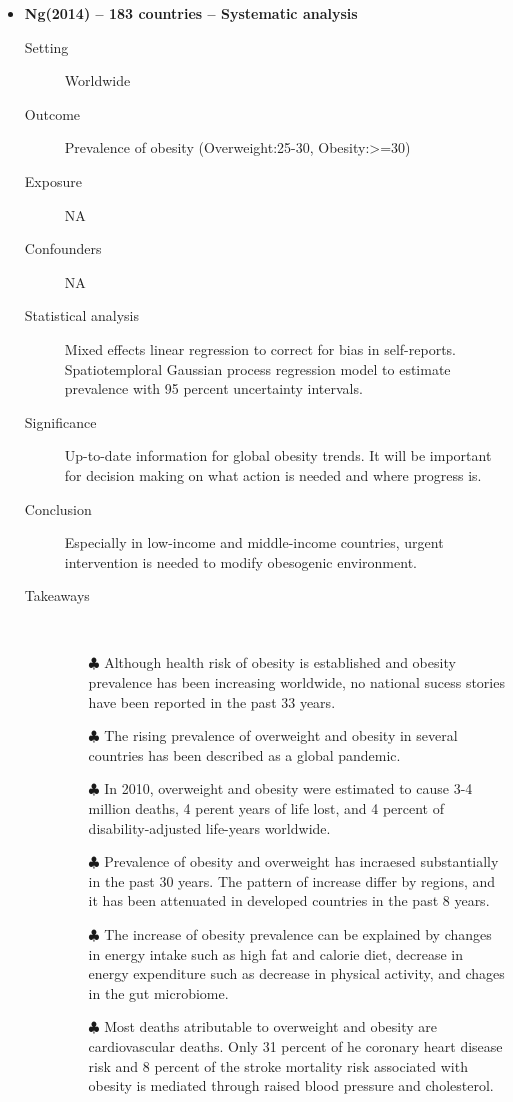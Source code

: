 \documentclass{article}
\begin{document}
\begin{itemize}
\item{\bf Ng(2014) -- 183 countries -- Systematic analysis} 
		\begin{description}
			\item[Setting] Worldwide 
			\item[Outcome] Prevalence of obesity (Overweight:25-30, Obesity:>=30) 
			\item[Exposure] NA 
			\item[Confounders] NA 
			\item[Statistical analysis] Mixed effects linear regression to correct for bias in self-reports. Spatiotemploral Gaussian process regression model to estimate prevalence with 95 percent uncertainty intervals. 
			\item[Significance] Up-to-date information for global obesity trends. It will be important for decision making on what action is needed and where progress is. 
			\item[Conclusion] Especially in low-income and middle-income countries, urgent intervention is needed to modify obesogenic environment. 
			\item[Takeaways] \mbox{}\\
				\begin{itemize}
					\item[$\clubsuit$] Although health risk of obesity is established and obesity prevalence has been increasing worldwide, no national sucess stories have been reported in the past 33 years. 
					\item[$\clubsuit$] The rising prevalence of overweight and obesity in several countries has been described as a global pandemic.  
					\item[$\clubsuit$] In 2010, overweight and obesity were estimated to cause 3-4 million deaths, 4 perent years of life lost, and 4 percent of disability-adjusted life-years worldwide. 
					\item[$\clubsuit$] Prevalence of obesity and overweight has incraesed substantially in the past 30 years. The pattern of increase differ by regions, and it has been attenuated in developed countries in the past 8 years.
					\item[$\clubsuit$] The increase of obesity prevalence can be explained by changes in energy intake such as high fat and calorie diet, decrease in energy expenditure such as decrease in physical activity, and chages in the gut microbiome.
					\item[$\clubsuit$] Most deaths atributable to overweight and obesity are cardiovascular deaths. Only 31 percent of he coronary heart disease risk and 8 percent of the stroke mortality risk associated with obesity is mediated through raised blood pressure and cholesterol.
				\end{itemize} 
			

\end{description}
\end{itemize}
\end{document}
